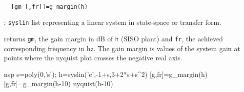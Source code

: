 \begin{mandesc}
   \\ %
\end{mandesc}
\begin{calling_sequence}
\begin{verbatim}
  [gm [,fr]]=g_margin(h)   
\end{verbatim}
\end{calling_sequence}
\begin{parameters}
  \begin{varlist}
    : \verb!syslin! list representing a linear system 
    in state-space or transfer form.
  \end{varlist}
\end{parameters}
\begin{mandescription}
  returns \verb!gm!, the gain margin in dB of \verb!h! 
  (SISO plant) and \verb!fr!, the achieved corresponding frequency in hz.
  The gain margin is values of the system gain at points where the
  nyquist plot crosses the negative real axis.
\end{mandescription}
\begin{examples}
  \begin{mintednsp}{nsp}
    s=poly(0,'s');
    h=syslin('c',-1+s,3+2*s+s^2)
    [g,fr]=g_margin(h)
    [g,fr]=g_margin(h-10)
    nyquist(h-10)
  \end{mintednsp}
\end{examples}
\begin{manseealso}
       
\end{manseealso}

